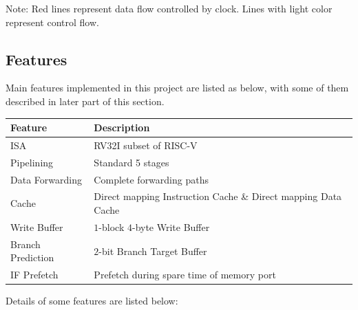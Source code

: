 \documentclass{article}
\begin{document}
            Note: Red lines represent data flow controlled by clock.
            Lines with light color represent control flow.

        \subsection{Features}
            
            Main features implemented in this project are listed as below, with some of them described in later part of this section.

            \begin{table}[h]
            \centering
            \begin{tabular}{l l}
                \toprule
                Feature & Description\\
                \midrule
                ISA & RV32I subset of RISC-V\\
                Pipelining & Standard 5 stages\\
                Data Forwarding & Complete forwarding paths\\
                Cache & Direct mapping Instruction Cache \& Direct mapping Data Cache\\
                Write Buffer & $1$-block $4$-byte Write Buffer\\
                Branch Prediction & $2$-bit Branch Target Buffer\\
                IF Prefetch & Prefetch during spare time of memory port\\
                \bottomrule
            \end{tabular}
            \end{table}

            Details of some features are listed below:
\end{document}
